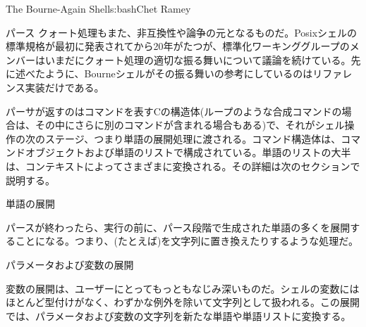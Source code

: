 \begin{aosachapter}{The Bourne-Again Shell}{s:bash}{Chet Ramey}
\begin{aosasect1}{パース}
クォート処理もまた、非互換性や論争の元となるものだ。Posixシェルの標準規格が最初に発表されてから20年がたつが、標準化ワーキンググループのメンバーはいまだにクォート処理の適切な振る舞いについて議論を続けている。先に述べたように、Bourneシェルがその振る舞いの参考にしているのはリファレンス実装だけである。

パーサが返すのはコマンドを表すCの構造体(ループのような合成コマンドの場合は、その中にさらに別のコマンドが含まれる場合もある)で、それがシェル操作の次のステージ、つまり単語の展開処理に渡される。コマンド構造体は、コマンドオブジェクトおよび単語のリストで構成されている。単語のリストの大半は、コンテキストによってさまざまに変換される。その詳細は次のセクションで説明する。

\end{aosasect1}

\begin{aosasect1}{単語の展開}

パースが終わったら、実行の前に、パース段階で生成された単語の多くを展開することになる。つまり、(たとえば)を文字列に置き換えたりするような処理だ。

\begin{aosasect2}{パラメータおよび変数の展開}

変数の展開は、ユーザーにとってもっともなじみ深いものだ。シェルの変数にはほとんど型付けがなく、わずかな例外を除いて文字列として扱われる。この展開では、パラメータおよび変数の文字列を新たな単語や単語リストに変換する。


\end{aosasect2}
\end{aosasect1}
\end{aosachapter}
